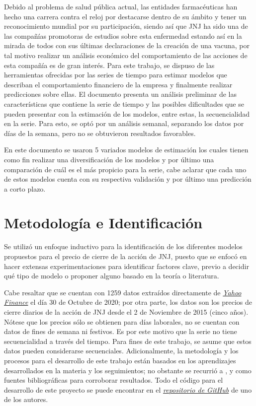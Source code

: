 \documentclass[conference]{IEEEtran}
\begin{document}
Debido al problema de salud pública actual, las entidades farmacéuticas han hecho una carrera contra el reloj por destacarse dentro de su ámbito y tener un reconocimiento mundial por su participación, siendo así que JNJ ha sido una de las compañías promotoras de estudios sobre esta enfermedad estando así en la mirada de todos con sus últimas declaraciones de la creación de una vacuna, por tal motivo realizar un análisis económico del comportamiento de las acciones de esta compañía es de gran interés. Para este trabajo, se dispuso de las herramientas ofrecidas por las series de tiempo para estimar modelos que describan el comportamiento  financiero de la empresa y finalmente realizar predicciones sobre ellas. El documento presenta un análisis preliminar de las características que contiene la serie de tiempo y las posibles dificultades que se pueden presentar con la estimación de los modelos, entre estas, la secuencialidad en la serie. Para esto, se optó por un análisis semanal, separando los datos por días de la semana, pero no se obtuvieron resultados favorables. 

En este documento se usaron 5 variados modelos de estimación los cuales tienen como fin realizar una diversificación de los modelos y por último una comparación de cuál es el más propicio para la serie, cabe aclarar que cada uno de estos modelos cuenta con su respectiva validación y por último una predicción a corto plazo. 

\section{Metodología e Identificación}
Se utilizó un enfoque inductivo para la identificación de los diferentes modelos propuestos para el precio de cierre de la acción de JNJ, puesto que se enfocó en hacer extensas experimentaciones para identificar factores clave, previo a decidir qué tipo de modelo o proponer alguno basado en la teoría o literatura.

Cabe resaltar que se cuentan con 1259 datos extraídos directamente de \href{https://finance.yahoo.com}{\textit{Yahoo Finance}} el día 30 de Octubre de 2020; por otra parte, los datos son los precios de cierre diarios de la acción de JNJ desde el 2 de Noviembre de 2015 (cinco años). Nótese que los precios sólo se obtienen para días laborales, no se cuentan con datos de fines de semana ni festivos. Es por este motivo que la serie no tiene secuencialidad a través del tiempo. Para fines de este trabajo, se asume que estos datos pueden considerarse secuenciales. Adicionalmente, la metodología y los procesos para el desarrollo de este trabajo están basados en los aprendizajes desarrollados en la materia y los seguimientos; no obstante se recurrió a \cite{uriel1985}, \cite{tsay2005analysis} y \cite{shumway2017time} como fuentes bibliográficas para corroborar resultados. Todo el código para el desarrollo de este proyecto se puede encontrar en el \href{https://github.com/Daples/daples/tree/master/time-series/src}{\textit{repositorio de GitHub}} de uno de los autores.
\end{document}
